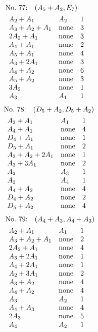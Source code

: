 %
%
\begin{align*}
&\hbox to 4cm {\textrm{No.~77:}\quad$(A_{5}+A_{2}, E_{7})$\hss}\\ 
&\begin{array}{lll}
A_{2}+A_{1} & A_{2} & 1\\
A_{3}+A_{2}+A_{1} & \none & 3\\
2A_{2}+A_{1} & \none & 3\\
A_{4}+A_{1} & \none & 2\\
A_{5}+A_{1} & \none & 4\\
A_{3}+2A_{1} & \none & 3\\
A_{4}+A_{2} & \none & 6\\
A_{5}+A_{2} & \none & 3\\
3A_{2} & \none & 1\\
A_{3} & A_{1} & 1\\
\end{array}
\end{align*}
%
%
\begin{align*}
&\hbox to 4cm {\textrm{No.~78:}\quad$(D_{5}+A_{2}, D_{5}+A_{2})$\hss}\\ 
&\begin{array}{lll}
A_{3}+A_{1} & A_{1} & 1\\
A_{4}+A_{1} & \none & 4\\
D_{4}+A_{1} & \none & 1\\
D_{5}+A_{1} & \none & 2\\
A_{3}+A_{2}+2A_{1} & \none & 1\\
A_{3}+3A_{1} & \none & 2\\
A_{2} & A_{3} & 1\\
A_{2} & A_{4} & 1\\
A_{4}+A_{2} & \none & 4\\
D_{4}+A_{2} & \none & 2\\
D_{5}+A_{2} & \none & 4\\
\end{array}
\end{align*}
%
%
\begin{align*}
&\hbox to 4cm {\textrm{No.~79:}\quad$(A_{4}+A_{3}, A_{4}+A_{3})$\hss}\\ 
&\begin{array}{lll}
A_{2}+A_{1} & A_{1} & 1\\
A_{3}+A_{2}+A_{1} & \none & 2\\
2A_{2}+A_{1} & \none & 4\\
A_{3}+2A_{1} & \none & 1\\
A_{4}+2A_{1} & \none & 1\\
A_{2}+3A_{1} & \none & 2\\
A_{3}+A_{2} & \none & 4\\
A_{4}+A_{2} & \none & 4\\
A_{3} & A_{2} & 1\\
A_{4}+A_{3} & \none & 4\\
2A_{3} & \none & 5\\
A_{4} & A_{2} & 1\\
\end{array}
\end{align*}
